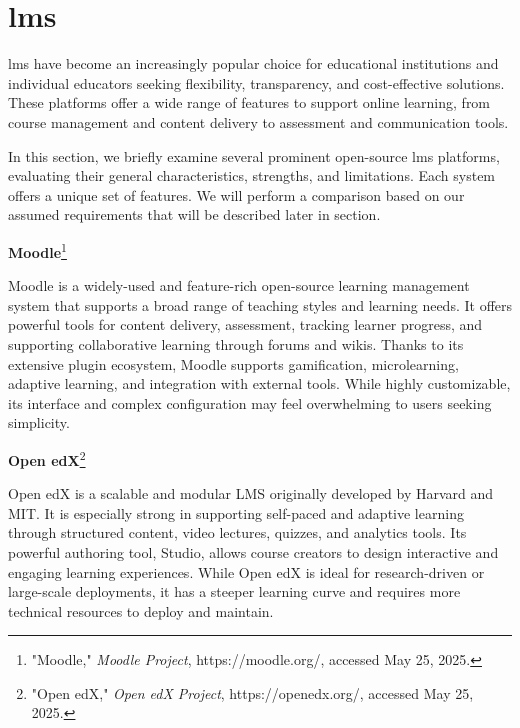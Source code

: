 
\section{\ac{lms}}


\ac{lms} have become an increasingly popular choice for educational institutions and individual educators seeking flexibility, transparency, and cost-effective solutions. These platforms offer a wide range of features to support online learning, from course management and content delivery to assessment and communication tools.

In this section, we briefly examine several prominent open-source \ac{lms} platforms, evaluating their general characteristics, strengths, and limitations. Each system offers a unique set of features. We will perform a comparison based on our assumed requirements that will be described later in section. %

\textbf{Moodle}\footnote{"Moodle," \textit{Moodle Project}, https://moodle.org/, accessed May 25, 2025.}


Moodle is a widely-used and feature-rich open-source learning management system that supports a broad range of teaching styles and learning needs. It offers powerful tools for content delivery, assessment, tracking learner progress, and supporting collaborative learning through forums and wikis. Thanks to its extensive plugin ecosystem, Moodle supports gamification, microlearning, adaptive learning, and integration with external tools. While highly customizable, its interface and complex configuration may feel overwhelming to users seeking simplicity.

\newpage

\textbf{Open edX}\footnote{"Open edX," \textit{Open edX Project}, https://openedx.org/, accessed May 25, 2025.}

Open edX is a scalable and modular LMS originally developed by Harvard and MIT. It is especially strong in supporting self-paced and adaptive learning through structured content, video lectures, quizzes, and analytics tools. Its powerful authoring tool, Studio, allows course creators to design interactive and engaging learning experiences. While Open edX is ideal for research-driven or large-scale deployments, it has a steeper learning curve and requires more technical resources to deploy and maintain.

